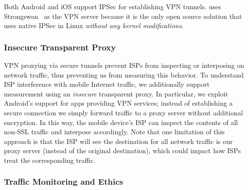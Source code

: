 Both Android and iOS support IPSec for establishing VPN tunnels.  
\platname uses Strongswan~\cite{strongswan} as the VPN server because it is the only open source solution 
that uses native IPSec in Linux \emph{without any kernel modifications}.

\subsubsection{Insecure Transparent Proxy} 

VPN proxying via secure tunnels prevent ISPs from inspecting or interposing on network traffic, 
thus preventing us from measuring this behavior. To understand ISP interference with mobile 
Internet traffic, we additionally support measurement using an \emph{insecure} transparent proxy. 
In particular, we exploit Android's support for apps providing VPN services; instead of establishing a 
secure connection we simply forward traffic to a proxy server without additional encryption. In this way, 
the mobile device's ISP can inspect the contents of all non-SSL traffic and interpose accordingly. 
Note that one limitation of this approach is that the ISP will see the destination for all network traffic 
is our proxy server (instead of the original destination), which could impact how ISPs treat the 
corresponding traffic.  


\subsubsection{Traffic Monitoring and Ethics}

